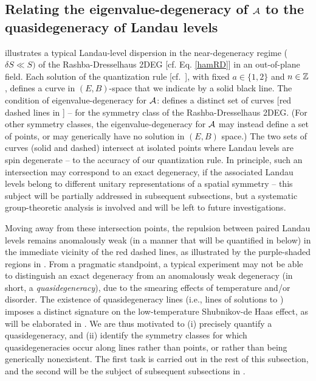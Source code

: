 \documentclass[aps, showpacs, twocolumn, notitlepage, superscriptaddress]{revtex4-1}
\begin{document}
\subsection{Relating the eigenvalue-degeneracy of ${\cal A}$ to the quasidegeneracy of Landau levels}\label{sec:relatedegeneracies}


 illustrates a typical Landau-level dispersion in the near-degeneracy regime ($\delta S{\ll} S)$ of the Rashba-Dresselhaus 2DEG [cf. Eq. \ref{hamRD}] in an out-of-plane field. Each solution of the quantization rule [cf.\ ], with fixed $a\in \{1,2\}$ and $n \in \mathbb{Z}$, defines a curve in $(E,B)$-space that we indicate by  a solid black line. The condition of eigenvalue-degeneracy for ${\cal A}$:  
defines a distinct set of curves [red dashed lines in ] -- for the symmetry class of the Rashba-Dresselhaus 2DEG. (For other symmetry classes, the eigenvalue-degeneracy for ${\cal A}$ may instead define a set of points, or may generically have no solution in $(E,B)$ space.)   The two sets of curves (solid and dashed) intersect at isolated points where Landau levels are spin degenerate -- to the accuracy of our quantization rule. In principle, such an intersection may correspond to an exact  degeneracy, if the associated Landau levels belong to different unitary representations of a spatial symmetry -- this subject will be partially addressed in subsequent subsections, but a systematic group-theoretic analysis is involved and will be left to future investigations.

Moving away from these intersection points, the repulsion between paired Landau levels  remains anomalously weak (in a manner that will be quantified in  below) in the immediate vicinity of the red dashed lines, as illustrated by the purple-shaded regions in .  From a pragmatic standpoint, a typical experiment may not be able to distinguish an exact degeneracy from an anomalously weak degeneracy (in short, a \textit{quasidegeneracy}), due to the smearing effects of temperature and/or disorder\cite{shoenberg_magnetic_2009}. The existence of  quasidegeneracy lines (i.e., lines of solutions to ) imposes a distinct signature on the low-temperature Shubnikov-de Haas effect, as will be elaborated in .  We are thus motivated to (i) precisely quantify a quasidegeneracy, and (ii) identify the symmetry classes for which quasidegeneracies occur along lines rather than points, or rather than being generically nonexistent. The first task is carried out in the rest of this subsection, and the second will be the subject of subsequent subsections in . 
\end{document}
